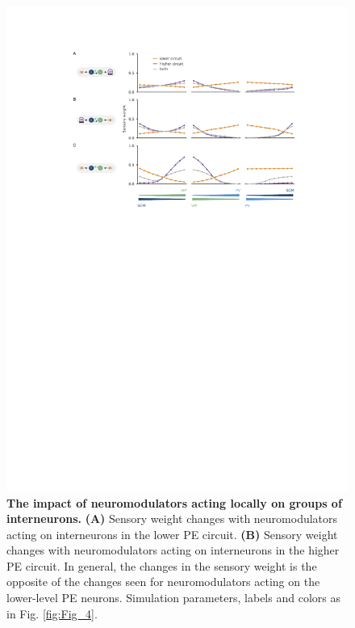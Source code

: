 \documentclass[10pt,a4paper]{article}
\begin{document}
\begin{figure}[!h]
	\centering
    \includegraphics{../results/figures/final/Fig_4_S2}%
\caption{\footnotesize{\bf The impact of neuromodulators acting locally on groups of interneurons. \newline}  
{\bf (A)} Sensory weight changes with neuromodulators acting on interneurons in the lower PE circuit.
{\bf (B)} Sensory weight changes with neuromodulators acting on interneurons in the higher PE circuit. In general, the changes in the sensory weight is the opposite of the changes seen for neuromodulators acting on the lower-level PE neurons. Simulation parameters, labels and colors as in Fig. \ref{fig:Fig_4}. 
}
\label{fig:Fig_4_S2}
\end{figure}
\end{document}
